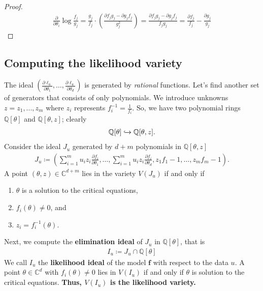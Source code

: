 \documentclass[a4paper, 11pt]{article}
\begin{document}
\begin{proof}
  \begin{align*}
    \frac{\partial}{\partial \theta_i} \log{\frac{f_j}{g_j}} = \frac{g_j}{f_j} \cdot \left( \frac{\partial f_j g_j - \partial g_j f_j}{g_j^2} \right) = \frac{\partial f_j g_j - \partial g_j f_j}{f_j g_j} = \frac{\partial f_j}{f_j} - \frac{\partial g_j}{g_j}
  \end{align*}
\end{proof}

\subsection{Computing the likelihood variety}

The ideal \( (\frac{\partial \ell_u}{\partial \theta_1}, \dots, \frac{\partial \ell_u}{\partial \theta_d}) \) is generated by \emph{rational} functions. Let's find another set of generators that consists of only polynomials. We introduce unknowns \( z = z_1,...,z_m \) where \( z_i \) represents \( f_i^{-1} = \frac{1}{f_i} \). So, we have two polynomial rings \( \mathbb Q[\theta] \) and \( \mathbb Q[\theta, z] \); clearly 
\begin{align*}
  \mathbb Q[\theta] \xhookrightarrow{} \mathbb Q[\theta, z].
\end{align*}
Consider the ideal \( J_u \) generated by \( d + m \) polynomials in \( \mathbb Q [\theta, z] \)
\begin{align*}
  J_u \coloneqq \left(
    \sum^m_{i=1}u_i z_i\frac{\partial f_i}{\partial \theta_1}, 
    \dots,
    \sum^m_{i=1}u_i z_i\frac{\partial f_i}{\partial \theta_d}, 
    z_1 f_1 - 1, \dots , z_m f_m - 1 
  \right).
\end{align*}
A point \( (\theta, z) \in \mathbb C^{d+m} \) lies in the variety \( V(J_u) \) if and only if
\begin{enumerate}
  \item \( \theta \) is a solution to the critical equations,
  \item \( f_i(\theta) \neq 0 \), and
  \item \( z_i = f_i^{-1}(\theta) \).
\end{enumerate}
 Next, we compute the \textbf{elimination ideal} of \( J_u \) in \( \mathbb Q[\theta] \), that is 
\begin{align*}
  I_u \coloneqq J_u \cap \mathbb Q[\theta]
\end{align*}
We call \( I_u \) the \textbf{likelihood ideal} of the model \( \mathbf f \) with respect to the data \( u \). A point \( \theta \in \mathbb C^d \) with \( f_i(\theta) \neq 0 \) lies in \( V(I_u) \) if and only if \( \theta \) is solution to the critical equations. \textbf{Thus, \( V(I_u) \) is the likelihood variety.}
\end{document}
